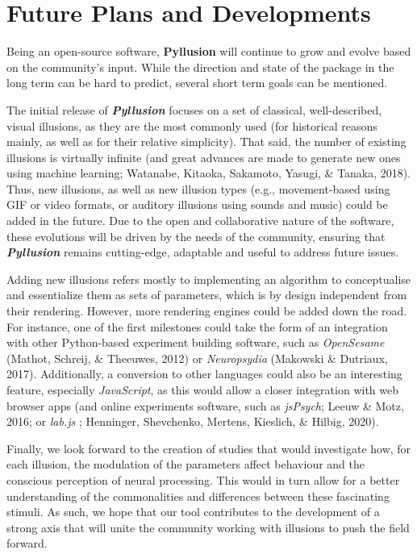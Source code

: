 \documentclass[
  english,
  man,floatsintext]{apa6}
\begin{document}
\hypertarget{future-plans-and-developments}{%
\section{Future Plans and Developments}\label{future-plans-and-developments}}

Being an open-source software, \textbf{Pyllusion} will continue to grow and evolve based on the community's input. While the direction and state of the package in the long term can be hard to predict, several short term goals can be mentioned.

The initial release of \textbf{\emph{Pyllusion}} focuses on a set of classical, well-described, visual illusions, as they are the most commonly used (for historical reasons mainly, as well as for their relative simplicity). That said, the number of existing illusions is virtually infinite (and great advances are made to generate new ones using machine learning; Watanabe, Kitaoka, Sakamoto, Yasugi, \& Tanaka, 2018). Thus, new illusions, as well as new illusion types (e.g., movement-based using GIF or video formats, or auditory illusions using sounds and music) could be added in the future. Due to the open and collaborative nature of the software, these evolutions will be driven by the needs of the community, ensuring that \textbf{\emph{Pyllusion}} remains cutting-edge, adaptable and useful to address future issues.

Adding new illusions refers mostly to implementing an algorithm to conceptualise and essentialize them as sets of parameters, which is by design independent from their rendering. However, more rendering engines could be added down the road. For instance, one of the first milestones could take the form of an integration with other Python-based experiment building software, such as \emph{OpenSesame} (Mathot, Schreij, \& Theeuwes, 2012) or \emph{Neuropsydia} (Makowski \& Dutriaux, 2017). Additionally, a conversion to other languages could also be an interesting feature, especially \emph{JavaScript}, as this would allow a closer integration with web browser apps (and online experiments software, such as \emph{jsPsych}; Leeuw \& Motz, 2016; or \emph{lab.js} ; Henninger, Shevchenko, Mertens, Kieslich, \& Hilbig, 2020).

Finally, we look forward to the creation of studies that would investigate how, for each illusion, the modulation of the parameters affect behaviour and the conscious perception of neural processing. This would in turn allow for a better understanding of the commonalities and differences between these fascinating stimuli. As such, we hope that our tool contributes to the development of a strong axis that will unite the community working with illusions to push the field forward.
\end{document}
